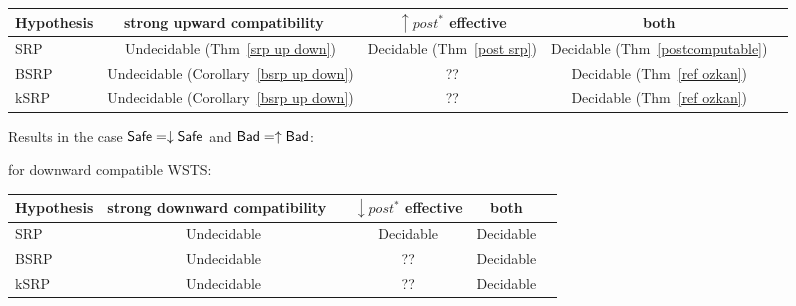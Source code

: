\begin{center}
\begin{tabular}{ | l | c | c | c | c |}
\hline  Hypothesis & strong upward compatibility ~ & $\uparrow post^*$ effective & both  \\ \hline
   SRP & Undecidable (Thm~\ref{srp up down}) & Decidable (Thm~\ref{post srp})  & Decidable (Thm~\ref{postcomputable})\\ \hline
   BSRP & Undecidable (Corollary~\ref{bsrp up down}) &  ??  & Decidable (Thm~\ref{ref ozkan}) \\ \hline
      kSRP & Undecidable (Corollary~\ref{bsrp up down}) & ?? & Decidable (Thm~\ref{ref ozkan}) \\ \hline
 \end{tabular}
\end{center}


Results in the case $\textsf{Safe} = \downarrow \textsf{Safe}$ and $\textsf{Bad} = \uparrow \textsf{Bad}$:

 for downward compatible WSTS:

\begin{center}
\begin{tabular}{ | l | c | c | c | c |}
\hline  Hypothesis & strong downward compatibility ~ & $\downarrow post^*$ effective & both  \\ \hline
   SRP & Undecidable  & Decidable   & Decidable \\ \hline
   BSRP & Undecidable  &  ??  & Decidable \\ \hline
      kSRP & Undecidable  & ?? & Decidable  \\ \hline
 \end{tabular}
\end{center}

